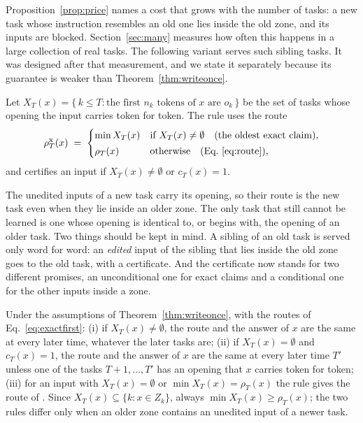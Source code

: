 Proposition~\ref{prop:price} names a cost that grows with the number of tasks: a new task whose
instruction resembles an old one lies inside the old zone, and its inputs are blocked.
Section~\ref{sec:many} measures how often this happens in a large collection of real tasks. The
following variant serves such sibling tasks. It was designed after that measurement, and we state
it separately because its guarantee is weaker than Theorem~\ref{thm:writeonce}.

\begin{definition}
Let $X_T(x) = \{\, k \le T : \text{the first } n_k \text{ tokens of } x \text{ are } o_k \,\}$ be the
set of tasks whose opening the input carries token for token. The rule \exactfirst{} uses the route
\begin{equation}
  \rho^{\mathrm{x}}_T(x) \;=\;
  \begin{cases}
    \min X_T(x) & \text{if } X_T(x) \neq \emptyset \quad \text{(the oldest exact claim)}, \\[2pt]
    \rho_T(x) & \text{otherwise} \quad \text{(Eq.~\ref{eq:route})} ,
  \end{cases}
  \label{eq:exactfirst}
\end{equation}
and certifies an input if $X_T(x) \neq \emptyset$ or $c_T(x) = 1$.
\end{definition}

The unedited inputs of a new task carry its opening, so their route is the new task even when they
lie inside an older zone. The only task that still cannot be learned is one whose opening is
identical to, or begins with, the opening of an older task. Two things should be kept in mind. A
sibling of an old task is served only word for word: an \emph{edited} input of the sibling that lies
inside the old zone goes to the old task, with a certificate. And the certificate now stands for
two different promises, an unconditional one for exact claims and a conditional one for the other
inputs inside a zone.

\begin{proposition}
\label{prop:exactfirst}
Under the assumptions of Theorem~\ref{thm:writeonce}, with the routes of Eq.~\eqref{eq:exactfirst}:
(i) if $X_T(x) \neq \emptyset$, the route and the answer of $x$ are the same at every later time,
whatever the later tasks are; (ii) if $X_T(x) = \emptyset$ and $c_T(x) = 1$, the route and the answer
of $x$ are the same at every later time $T'$ unless one of the tasks $T+1, \dots, T'$ has an opening
that $x$ carries token for token; (iii) for an input with $X_T(x) = \emptyset$ or
$\min X_T(x) = \rho_T(x)$ the rule gives the route of \cert{}. Since $X_T(x) \subseteq \{k : x \in Z_k\}$, always
$\min X_T(x) \ge \rho_T(x)$; the two rules differ only when an older zone contains an unedited input of a newer task.
\end{proposition}

